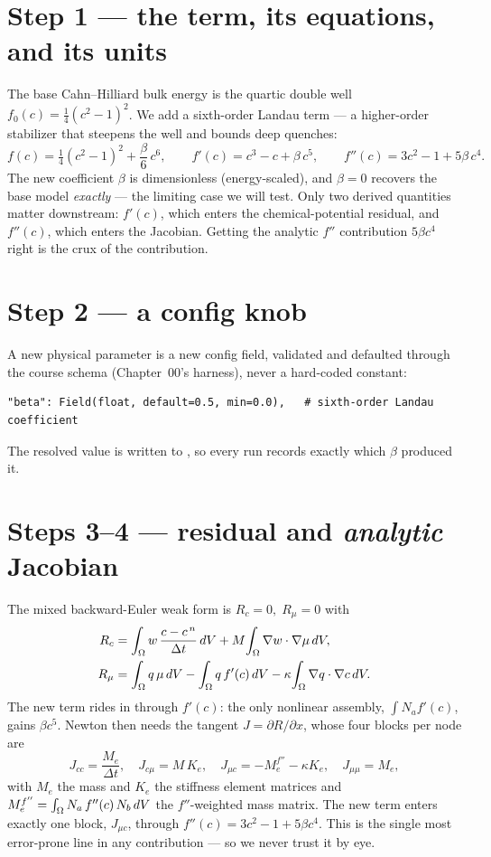 \section{Step 1 --- the term, its equations, and its units}

The base Cahn--Hilliard bulk energy is the quartic double well
$f_0(c)=\tfrac14(c^2-1)^2$. We add a sixth-order Landau term --- a higher-order
stabilizer that steepens the well and bounds deep quenches:
%
\begin{equation}
  f(c) = \tfrac14(c^2-1)^2 + \frac{\beta}{6}\,c^6 ,\qquad
  f'(c) = c^3 - c + \beta\,c^5 ,\qquad
  f''(c) = 3c^2 - 1 + 5\beta\,c^4 .
\end{equation}
%
The new coefficient $\beta$ is dimensionless (energy-scaled), and
$\beta=0$ recovers the base model \emph{exactly} --- the limiting case we will
test. Only two derived quantities matter downstream: $f'(c)$, which enters the
chemical-potential residual, and $f''(c)$, which enters the Jacobian. Getting
the analytic $f''$ contribution $5\beta c^4$ right is the crux of the
contribution.

\section{Step 2 --- a config knob}

A new physical parameter is a new config field, validated and defaulted through
the course schema (Chapter~00's harness), never a hard-coded constant:
\begin{lstlisting}
"beta": Field(float, default=0.5, min=0.0),   # sixth-order Landau coefficient
\end{lstlisting}
The resolved value is written to , so every run
records exactly which $\beta$ produced it.

\section{Steps 3--4 --- residual and \emph{analytic} Jacobian}

The mixed backward-Euler weak form is $R_c=0,\;R_\mu=0$ with
%
\begin{align}
  R_c   &= \int_\Omega w\,\frac{c-c^{\,n}}{\Delta t}\,dV
         + M\!\int_\Omega \nabla w\cdot\nabla\mu\,dV, \\
  R_\mu &= \int_\Omega q\,\mu\,dV - \int_\Omega q\,f'(c)\,dV
         - \kappa\!\int_\Omega \nabla q\cdot\nabla c\,dV .
\end{align}
%
The new term rides in through $f'(c)$: the only nonlinear assembly,
$\int N_a f'(c)$, gains $\beta c^5$. Newton then needs the tangent
$J=\partial R/\partial x$, whose four blocks per node are
%
\begin{equation}
  J_{cc}=\frac{M_e}{\Delta t},\quad
  J_{c\mu}=M\,K_e,\quad
  J_{\mu c}=-M_e^{f''}-\kappa K_e,\quad
  J_{\mu\mu}=M_e ,
\end{equation}
%
with $M_e$ the mass and $K_e$ the stiffness element matrices and
$M_e^{f''}=\int_\Omega N_a\,f''(c)\,N_b\,dV$ the $f''$-weighted mass matrix. The new
term enters exactly one block, $J_{\mu c}$, through
$f''(c)=3c^2-1+5\beta c^4$. This is the single most error-prone line in any
contribution --- so we never trust it by eye.

